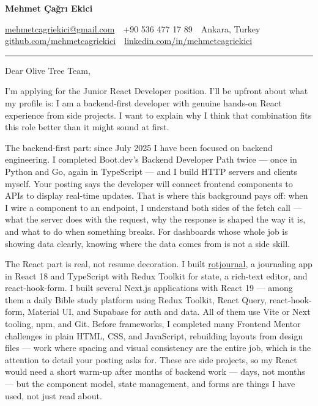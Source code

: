\documentclass[11pt,a4paper]{article}
\begin{document}
{\LARGE\bfseries\color{accent} Mehmet Çağrı Ekici}\par
\vspace{2pt}
{\small
\href{mailto:mehmetcagriekici@gmail.com}{mehmetcagriekici@gmail.com} \,\textbullet\,
+90 536 477 17 89 \,\textbullet\,
Ankara, Turkey \,\textbullet\,
\href{https://github.com/mehmetcagriekici}{github.com/mehmetcagriekici} \,\textbullet\,
\href{https://linkedin.com/in/mehmetcagriekici}{linkedin.com/in/mehmetcagriekici}
}

\vspace{10pt}
\hrule
\vspace{14pt}

Dear Olive Tree Team,

I'm applying for the Junior React Developer position. I'll be upfront about what my profile is: I am a backend-first developer with genuine hands-on React experience from side projects. I want to explain why I think that combination fits this role better than it might sound at first.

The backend-first part: since July 2025 I have been focused on backend engineering. I completed Boot.dev's Backend Developer Path twice --- once in Python and Go, again in TypeScript --- and I build HTTP servers and clients myself. Your posting says the developer will connect frontend components to APIs to display real-time updates. That is where this background pays off: when I wire a component to an endpoint, I understand both sides of the fetch call --- what the server does with the request, why the response is shaped the way it is, and what to do when something breaks. For dashboards whose whole job is showing data clearly, knowing where the data comes from is not a side skill.

The React part is real, not resume decoration. I built \href{https://github.com/mehmetcagriekici/rotjournal}{rotjournal}, a journaling app in React 18 and TypeScript with Redux Toolkit for state, a rich-text editor, and react-hook-form. I built several Next.js applications with React 19 --- among them a daily Bible study platform using Redux Toolkit, React Query, react-hook-form, Material UI, and Supabase for auth and data. All of them use Vite or Next tooling, npm, and Git. Before frameworks, I completed many Frontend Mentor challenges in plain HTML, CSS, and JavaScript, rebuilding layouts from design files --- work where spacing and visual consistency are the entire job, which is the attention to detail your posting asks for. These are side projects, so my React would need a short warm-up after months of backend work --- days, not months --- but the component model, state management, and forms are things I have used, not just read about.
\end{document}
